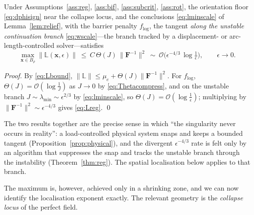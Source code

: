 \begin{theorem}
    \label{thm:reg}
    Under Assumptions~\ref{ass:reg}, \ref{ass:bif}, \ref{ass:subcrit}, \ref{ass:rot}, the orientation floor
    \eqref{eq:dphisign} near the collapse locus, and the conclusions
    \eqref{eq:lminscale} of Lemma~\ref{lem:relief}, with the barrier penalty $f_{\log}$, the tangent \emph{along the
    unstable continuation
        branch} \eqref{eq:wscale}---the branch tracked by a displacement- or arc-length-controlled solver---satisfies
    \begin{equation}
        \label{eq:Lreg}
        \max_{\bm{x}\in B_\rho} \|\mathbb{L}(\bm{x},\epsilon)\|
        \ \le\ C\,\Theta(J)\,\|\bm{F}^{-1}\|^2
        \ \sim\ \mathcal{O}\!\big(\epsilon^{-4/3}\,\log\tfrac1\epsilon\big), \qquad \epsilon\to0 .
    \end{equation}
\end{theorem}

\begin{proof}
    By \eqref{eq:Lbound}, $\|\mathbb{L}\|\le\mu_e+\Theta(J)\|\bm{F}^{-1}\|^2$. For $f_{\log}$, $\Theta(J)=\mathcal{O}(\log\tfrac1J)$
    as $J\to0$ by \eqref{eq:Thetacompress}, and on the unstable branch $J\sim\lambda_{\min}\sim\epsilon^{2/3}$ by
    \eqref{eq:lminscale}, so $\Theta(J)=\mathcal{O}(\log\tfrac1\epsilon)$; multiplying by
    $\|\bm{F}^{-1}\|^2\sim\epsilon^{-4/3}$ gives \eqref{eq:Lreg}. \qed
\end{proof}

The two results together are the precise sense in which ``the singularity never occurs in reality'': a load-controlled
physical system snaps and keeps a bounded tangent (Proposition~\ref{prop:physical}), and the divergent
$\epsilon^{-4/3}$ rate is felt only by an algorithm that suppresses the snap and tracks the unstable branch through the
instability (Theorem~\ref{thm:reg}). The spatial localisation below applies to that branch.

The maximum is, however, achieved only in a shrinking zone, and we can now identify the localisation exponent exactly.
The relevant geometry is the \emph{collapse locus} of the perfect field.

